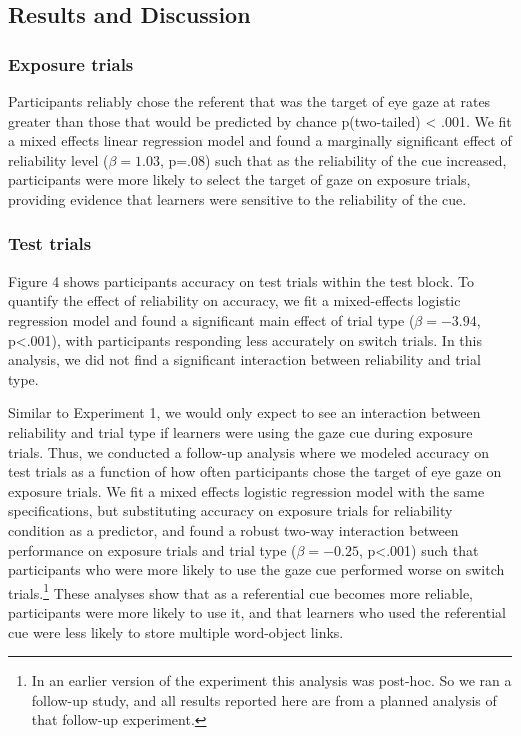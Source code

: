 \documentclass[12pt,]{article}
\let\rmarkdownfootnote\footnote%
\def\footnote{\protect\rmarkdownfootnote}
\begin{document}
\subsection{Results and Discussion}\label{results-and-discussion-2}

\subsubsection{Exposure trials}\label{exposure-trials-2}

Participants reliably chose the referent that was the target of eye gaze
at rates greater than those that would be predicted by chance
p(two-tailed) \textless{} .001. We fit a mixed effects linear regression
model and found a marginally significant effect of reliability level
(\(\beta = 1.03\), p=.08) such that as the reliability of the cue
increased, participants were more likely to select the target of gaze on
exposure trials, providing evidence that learners were sensitive to the
reliability of the cue.

\subsubsection{Test trials}\label{test-trials-2}

Figure 4 shows participants accuracy on test trials within the test
block. To quantify the effect of reliability on accuracy, we fit a
mixed-effects logistic regression model and found a significant main
effect of trial type (\(\beta = -3.94\), p\textless{}.001), with
participants responding less accurately on switch trials. In this
analysis, we did not find a significant interaction between reliability
and trial type.

Similar to Experiment 1, we would only expect to see an interaction
between reliability and trial type if learners were using the gaze cue
during exposure trials. Thus, we conducted a follow-up analysis where we
modeled accuracy on test trials as a function of how often participants
chose the target of eye gaze on exposure trials. We fit a mixed effects
logistic regression model with the same specifications, but substituting
accuracy on exposure trials for reliability condition as a predictor,
and found a robust two-way interaction between performance on exposure
trials and trial type (\(\beta = -0.25\), p\textless{}.001) such that
participants who were more likely to use the gaze cue performed worse on
switch trials.\footnote{In an earlier version of the experiment this
  analysis was post-hoc. So we ran a follow-up study, and all results
  reported here are from a planned analysis of that follow-up
  experiment.} These analyses show that as a referential cue becomes
more reliable, participants were more likely to use it, and that
learners who used the referential cue were less likely to store multiple
word-object links.
\end{document}
